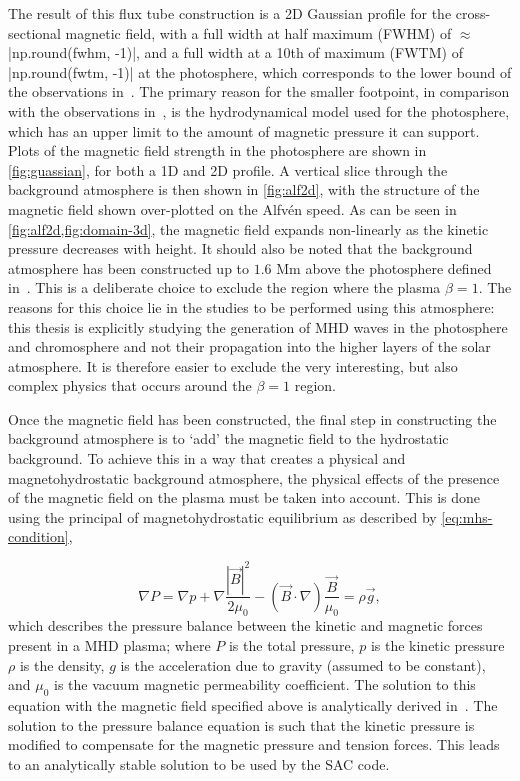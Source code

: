 The result of this flux tube construction is a 2D Gaussian profile for the cross-sectional magnetic field, with a full width at half maximum (FWHM) of $\approx$ \py[chapter3]|np.round(fwhm, -1)|, and a full width at a 10th of maximum (FWTM) of \py[chapter3]|np.round(fwtm, -1)| at the photosphere, which corresponds to the lower bound of the observations in~\cite{sanchezalmeida2004}.
The primary reason for the smaller footpoint, in comparison with the observations in~\cite{utz2013}, is the hydrodynamical model used for the photosphere, which has an upper limit to the amount of magnetic pressure it can support.
Plots of the magnetic field strength in the photosphere are shown in \cref{fig:guassian}, for both a 1D and 2D profile.
A vertical slice through the background atmosphere is then shown in \cref{fig:alf2d}, with the structure of the magnetic field shown over-plotted on the Alfv\'en speed.
As can be seen in \cref{fig:alf2d,fig:domain-3d}, the magnetic field expands non-linearly as the kinetic pressure decreases with height.
It should also be noted that the background atmosphere has been constructed up to $1.6$ Mm above the photosphere defined in~\cite{vernazza1981}.
This is a deliberate choice to exclude the region where the plasma $\beta = 1$.
The reasons for this choice lie in the studies to be performed using this atmosphere: this thesis is explicitly studying the generation of MHD waves in the photosphere and chromosphere and not their propagation into the higher layers of the solar atmosphere.
It is therefore easier to exclude the very interesting, but also complex physics that occurs around the $\beta = 1$ region.

Once the magnetic field has been constructed, the final step in constructing the background atmosphere is to `add' the magnetic field to the hydrostatic background.
To achieve this in a way that creates a physical and magnetohydrostatic background atmosphere, the physical effects of the presence of the magnetic field on the plasma must be taken into account.
This is done using the principal of magnetohydrostatic equilibrium as described by \cref{eq:mhs-condition},

\begin{equation}
\nabla P =
\nabla p + \nabla \frac{|\vec{B}|^2}{2\mu_0} - (\vec{B}\cdot\nabla)
{\frac{\vec{B}}{\mu_0} }
= \rho \vec{g},
\label{eq:mhs-condition}
\end{equation}
which describes the pressure balance between the kinetic and magnetic forces present in a MHD plasma;
where $P$ is the total pressure, $p$ is the kinetic pressure $\rho$ is the density, $g$ is the acceleration due to gravity (assumed to be constant), and $\mu_0$ is the vacuum magnetic permeability coefficient.
The solution to this equation with the magnetic field specified above is analytically derived in~\cite{gent2013,gent2014}.
The solution to the pressure balance equation is such that the kinetic pressure is modified to compensate for the magnetic pressure and tension forces.
This leads to an analytically stable solution to be used by the SAC code. 


